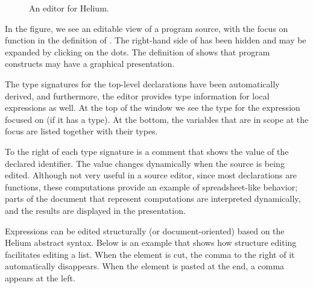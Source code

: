 \begin{figure}
\begin{center}
\caption{An editor for Helium.}\label{heliumMain} 
\end{center}
\end{figure}

In the figure, we see an editable view of a program source, with the focus on function  in the definition of . The right-hand side of  has been hidden and may be expanded by clicking on the dots. The definition of  shows that program constructs may have a graphical presentation.

The type signatures for the top-level declarations have been automatically derived, and furthermore,  the editor provides type information for local expressions as well. At the top of the window we see the type for the expression focused on (if it has a type). At the bottom, the variables that are in scope at the focus are listed together with their types.

To the right of each type signature is a comment that shows the value of the declared identifier. The value changes dynamically when the source is being edited. Although not very useful in a source editor, since most declarations are functions, these computations provide an example of spreadsheet-like behavior; parts of the document that represent computations are interpreted dynamically, and the results are displayed in the presentation.


Expressions can be edited structurally (or document-oriented) based on the Helium abstract syntax. Below is an example that shows how structure editing facilitates editing a list. When the  element is cut, the comma to the right of it automatically disappears. When the element is pasted at the end, a comma appears at the left. 

\newcommand{\protoscrshot}[4]{%
\parbox{#4mm}{\begin{center} \fbox{\epsfigPrx{#1}{#4}{#2}}\\
{\vspace{2mm}\small #3}\end{center}
}}%

\newcommand{\protoscrshotStep}[4]{%
\begin{tabular}[c]{@{}c@{}}
\fbox{\epsfigPrx{#1}{#4}{#2}}
\end{tabular}
}%


